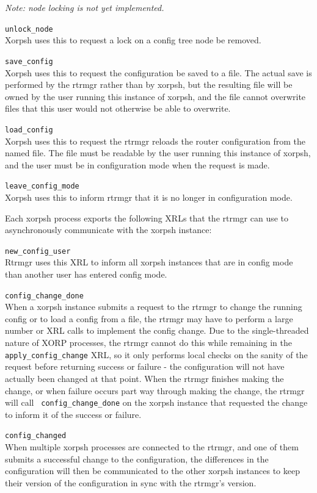 \documentclass[11pt]{article}
\begin{document}
\begin{description}
{\it Note: node locking is not yet implemented.}
\item{\tt unlock\_node} \\Xorpsh uses this to request a lock on a
config tree node be removed. 
\item{\tt save\_config} \\Xorpsh uses this to request the
configuration be saved to a file.  The actual save is performed by the
rtrmgr rather than by xorpsh, but the resulting file will be owned by
the user running this instance of xorpsh, and the file cannot
overwrite files that this user would not otherwise be able to
overwrite.
\item{\tt load\_config} \\Xorpsh uses this to request the rtrmgr reloads
the router configuration from the named file.  The file must be
readable by the user running this instance of xorpsh, and the user
must be in configuration mode when the request is made.
\item{\tt leave\_config\_mode} \\Xorpsh uses this to inform rtrmgr that
it is no longer in configuration mode.
\end{description}
\vspace{0.2in}
Each xorpsh process exports the following XRLs that the rtrmgr can use
to asynchronously communicate with the xorpsh instance:
\begin{description}
\item{\tt new\_config\_user} \\Rtrmgr uses this XRL to inform all
xorpsh instances that are in config mode than another user has entered
config mode.
\item{\tt config\_change\_done} \\When a xorpsh instance submits a
request to the rtrmgr to change the running config or to load a config
from a file, the rtrmgr may have to perform a large number or XRL calls
to implement the config change.  Due to the single-threaded nature of
XORP processes, the rtrmgr cannot do this while remaining in the {\tt
apply\_config\_change} XRL, so it only performs local checks on the
sanity of the request before returning success or failure - the
configuration will not have actually been changed at that point.  When
the rtrmgr finishes making the change, or when failure occurs part way
through making the change, the rtrmgr will call {\tt
config\_change\_done} on the xorpsh instance that requested the change
to inform it of the success or failure.
\item{\tt config\_changed} \\When multiple xorpsh processes are
connected to the rtrmgr, and one of them submits a successful change
to the configuration, the differences in the configuration will then
be communicated to the other xorpsh instances to keep their version of
the configuration in sync with the rtrmgr's version.
\end{description}
\end{document}
